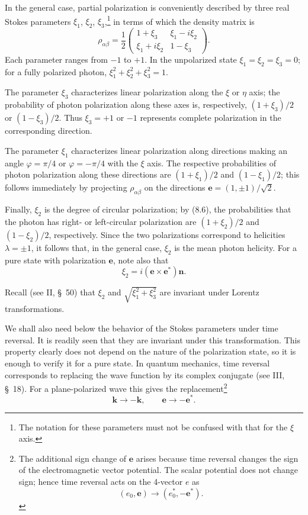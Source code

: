 In the general case, partial polarization is conveniently described by three real Stokes parameters $\xi_1$, $\xi_2$, $\xi_3$,\footnote{The notation for these parameters must not be confused with that for the $\xi$ axis.} in terms of which the density matrix is
\begin{equation}
\rho_{\alpha\beta}=\frac{1}{2}
\begin{pmatrix}
1+\xi_3 & \xi_1-i\xi_2\\
\xi_1+i\xi_2 & 1-\xi_3
\end{pmatrix}.
\tag{8.9}
\end{equation}
Each parameter ranges from $-1$ to $+1$. In the unpolarized state $\xi_1=\xi_2=\xi_3=0$; for a fully polarized photon, $\xi_1^2+\xi_2^2+\xi_3^2=1$.

The parameter $\xi_3$ characterizes linear polarization along the $\xi$ or $\eta$ axis; the probability of photon polarization along these axes is, respectively, $(1+\xi_3)/2$ or $(1-\xi_3)/2$. Thus $\xi_3=+1$ or $-1$ represents complete polarization in the corresponding direction.

The parameter $\xi_1$ characterizes linear polarization along directions making an angle $\varphi=\pi/4$ or $\varphi=-\pi/4$ with the $\xi$ axis. The respective probabilities of photon polarization along these directions are $(1+\xi_1)/2$ and $(1-\xi_1)/2$; this follows immediately by projecting $\rho_{\alpha\beta}$ on the directions $\mathbf{e}=(1,\pm1)/\sqrt{2}$.

Finally, $\xi_2$ is the degree of circular polarization; by (8.6), the probabilities that the photon has right- or left-circular polarization are $(1+\xi_2)/2$ and $(1-\xi_2)/2$, respectively. Since the two polarizations correspond to helicities $\lambda=\pm1$, it follows that, in the general case, $\xi_2$ is the mean photon helicity. For a pure state with polarization $\mathbf{e}$, note also that
\begin{equation}
\xi_2=i(\mathbf{e}\times\mathbf{e}^*)\mathbf{n}.
\tag{8.10}
\end{equation}

Recall (see II, \S~50) that $\xi_2$ and $\sqrt{\xi_1^2+\xi_3^2}$ are invariant under Lorentz transformations.

We shall also need below the behavior of the Stokes parameters under time reversal. It is readily seen that they are invariant under this transformation. This property clearly does not depend on the nature of the polarization state, so it is enough to verify it for a pure state. In quantum mechanics, time reversal corresponds to replacing the wave function by its complex conjugate (see III, \S~18). For a plane-polarized wave this gives the replacement\footnote{The additional sign change of $\mathbf{e}$ arises because time reversal changes the sign of the electromagnetic vector potential. The scalar potential does not change sign; hence time reversal acts on the 4-vector $e$ as
\begin{equation}
(e_0,\mathbf{e})\to(e_0^*,-\mathbf{e}^*).
\tag{8.11a}
\end{equation}}
\begin{equation}
\mathbf{k}\to-\mathbf{k},
\qquad
\mathbf{e}\to-\mathbf{e}^*.
\tag{8.11}
\end{equation}

